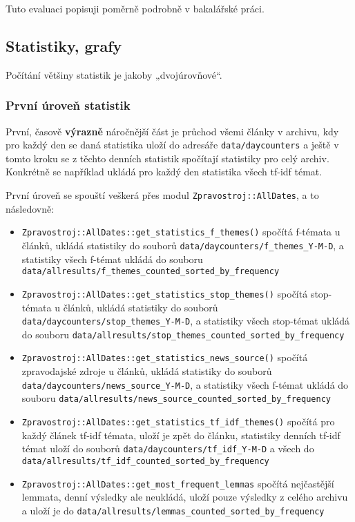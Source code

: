 \documentclass[12pt,a4paper]{report}
\def\uv#1{„#1“}
\begin{document}
Tuto evaluaci popisuji poměrně podrobně v bakalářské práci.

\subsection{Statistiky, grafy}

Počítání většiny statistik je jakoby \uv{dvojúrovňové}.

\subsubsection{První úroveň statistik}
První, časově \textbf{výrazně} náročnější část je průchod všemi články v archivu, kdy pro každý den se daná statistika uloží do adresáře \texttt{data/daycounters} a ještě v tomto kroku se z těchto denních statistik spočítají statistiky pro celý archiv. Konkrétně se například ukládá pro každý den statistika všech tf-idf témat.

První úroveň se spouští veškerá přes modul \texttt{Zpravostroj::AllDates}, a to následovně:

\begin{itemize}
	\item \texttt{Zpravostroj::AllDates::get\_statistics\_f\_themes()} spočítá f-témata u článků, ukládá statistiky do souborů \texttt{data/daycounters/f\_themes\_Y-M-D}, a statistiky všech f-témat ukládá do souboru \texttt{data/allresults/f\_themes\_counted\_sorted\_by\_frequency}
	\item \texttt{Zpravostroj::AllDates::get\_statistics\_stop\_themes()} spočítá stop-témata u článků, ukládá statistiky do souborů \texttt{data/daycounters/stop\_themes\_Y-M-D}, a statistiky všech stop-témat ukládá do souboru \texttt{data/allresults/stop\_themes\_counted\_sorted\_by\_frequency}
	\item \texttt{Zpravostroj::AllDates::get\_statistics\_news\_source()} spočítá zpravodajské zdroje u článků, ukládá statistiky do souborů \texttt{data/daycounters/news\_source\_Y-M-D}, a statistiky všech f-témat ukládá do souboru \texttt{data/allresults/news\_source\_counted\_sorted\_by\_frequency}
	\item \texttt{Zpravostroj::AllDates::get\_statistics\_tf\_idf\_themes()} spočítá pro každý článek tf-idf témata, uloží je zpět do článku, statistiky denních tf-idf témat uloží do souborů \texttt{data/daycounters/tf\_idf\_Y-M-D} a všech do \texttt{data/allresults/tf\_idf\_counted\_sorted\_by\_frequency}
	\item \texttt{Zpravostroj::AllDates::get\_most\_frequent\_lemmas} spočítá nejčastější lemmata, denní výsledky ale neukládá, uloží pouze výsledky z celého archivu a uloží je do \texttt{data/allresults/lemmas\_counted\_sorted\_by\_frequency}
\end{itemize}
\end{document}
